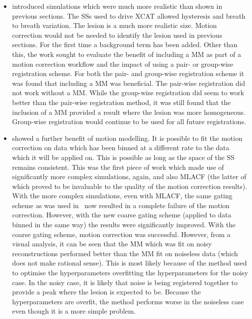 \begin{itemize}
            \item {} introduced simulations which were much more realistic than shown in previous sections. The \glspl{SS} used to drive \gls{XCAT} allowed hysteresis and breath to breath variation. The lesion is a much more realistic size. Motion correction would not be needed to identify the lesion used in previous sections. For the first time a background term has been added. Other than this, the work sought to evaluate the benefit of including a \gls{MM} as part of a motion correction workflow and the impact of using a pair- or group-wise registration scheme. For both the pair- and group-wise registration scheme it was found that including a \gls{MM} was beneficial. The pair-wise registration did not work without a \gls{MM}. While the group-wise registration did seem to work better than the pair-wise registration method, it was still found that the inclusion of a \gls{MM} provided a result where the lesion was more homogeneous. Group-wise registration would continue to be used for all future registrations.

            \item {} showed a further benefit of motion modelling. It is possible to fit the motion correction on data which has been binned at a different rate to the data which it will be applied on. This is possible as long as the space of the \gls{SS} remains consistent. This was the first piece of work which made use of significantly more complex simulations, again, and also \gls{MLACF} (the latter of which proved to be invaluable to the quality of the motion correction results). With the more complex simulations, even with \gls{MLACF}, the same gating scheme as was used in~ now resulted in a complete failure of the motion correction. However, with the new coarse gating scheme (applied to data binned in the same way) the results were significantly improved. With the coarse gating scheme, motion correction was successful. However, from a visual analysis, it can be seen that the \gls{MM} which was fit on noisy reconstructions performed better than the \gls{MM} fit on noiseless data (which does not make rational sense). This is most likely because of the method used to optimise the hyperparameters overfitting the hyperparameters for the noisy case. In the noisy case, it is likely that noise is being registered together to provide a peak where the lesion is expected to be. Because the hyperparameters are overfit, the method performs worse in the noiseless case even though it is a more simple problem.


\end{itemize}
